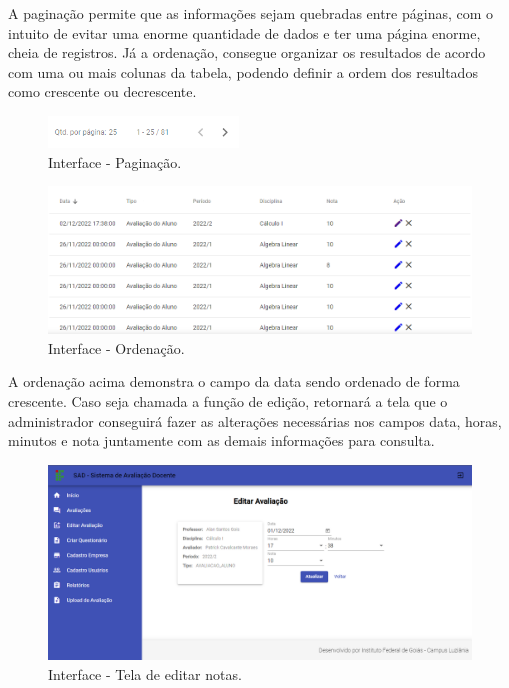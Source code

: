     A paginação permite que as informações sejam quebradas entre páginas, com o intuito de evitar uma enorme quantidade de dados e ter uma página enorme, cheia de registros. Já a ordenação, consegue organizar os resultados de acordo com uma ou mais colunas da tabela, podendo definir a ordem dos resultados como crescente ou decrescente.

        \begin{figure}[h]
        \centering
        \includegraphics[width=0.45\textwidth]{./img/Paginacao.png}
        \caption{Interface - Paginação.}
        \label{fig:Paginacao}
        \end{figure}

        \begin{figure}[h]
        \centering
        \includegraphics[width=1.0\textwidth]{./img/Ordenacao.png}
        \caption{Interface - Ordenação.}
        \label{fig:Ordenacao}
        \end{figure}

    A ordenação acima demonstra o campo da data sendo ordenado de forma crescente. Caso seja chamada a função de edição, retornará a tela que o administrador conseguirá fazer as alterações necessárias nos campos data, horas, minutos e nota juntamente com as demais informações para consulta.

        \begin{figure}[h]
        \centering
        \includegraphics[width=1.0\textwidth]{./img/Editar.png}
        \caption{Interface - Tela de editar notas.}
        \label{fig:Editar}
        \end{figure}
    

